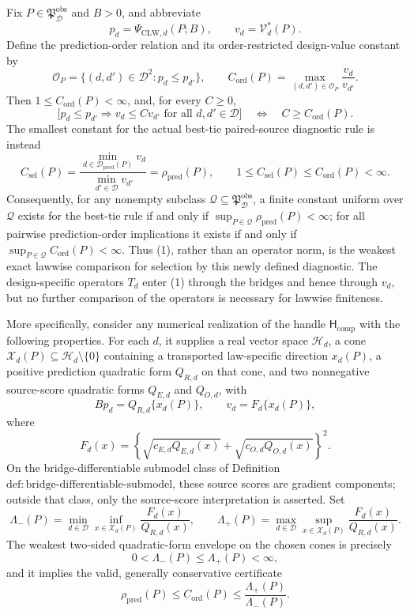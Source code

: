 Fix \(P\in\mathfrak P_{\mathcal D}^{\mathrm{obs}}\) and \(B>0\), and abbreviate
\[
 p_d=\Psi_{\mathrm{CLW},d}(P;B),
 \qquad v_d=\mathcal V_d^*(P).
\]
Define the prediction-order relation and its order-restricted design-value constant by
\[
 \mathcal O_P=\{(d,d')\in\mathcal D^2:p_d\le p_{d'}\},
 \qquad
 C_{\mathrm{ord}}(P)=\max_{(d,d')\in\mathcal O_P}\frac{v_d}{v_{d'}}. \tag{1}
\]
Then \(1\le C_{\mathrm{ord}}(P)<\infty\), and, for every \(C\ge0\),
\[
 \bigl[p_d\le p_{d'}\Longrightarrow v_d\le C v_{d'}
 \text{ for all }d,d'\in\mathcal D\bigr]
 \quad\Longleftrightarrow\quad C\ge C_{\mathrm{ord}}(P). \tag{2}
\]
The smallest constant for the actual best-tie paired-source diagnostic rule is instead
\[
 C_{\mathrm{sel}}(P)
 =\frac{\min_{d\in\mathcal D_{\mathrm{pred}}(P)}v_d}
 {\min_{d'\in\mathcal D}v_{d'}}
 =\rho_{\mathrm{pred}}(P),
 \qquad
 1\le C_{\mathrm{sel}}(P)\le C_{\mathrm{ord}}(P)<\infty. \tag{3}
\]
Consequently, for any nonempty subclass \(\mathcal Q\subseteq\mathfrak P_{\mathcal D}^{\mathrm{obs}}\), a finite constant uniform over \(\mathcal Q\) exists for the best-tie rule if and only if \(\sup_{P\in\mathcal Q}\rho_{\mathrm{pred}}(P)<\infty\); for all pairwise prediction-order implications it exists if and only if \(\sup_{P\in\mathcal Q}C_{\mathrm{ord}}(P)<\infty\). Thus (1), rather than an operator norm, is the weakest exact lawwise comparison for selection by this newly defined diagnostic. The design-specific operators \(T_d\) enter (1) through the bridges and hence through \(v_d\), but no further comparison of the operators is necessary for lawwise finiteness.

More specifically, consider any numerical realization of the handle \(\mathsf H_{\mathrm{comp}}\) with the following properties. For each \(d\), it supplies a real vector space \(\mathcal H_d\), a cone \(\mathcal X_d(P)\subseteq\mathcal H_d\setminus\{0\}\) containing a transported law-specific direction \(x_d(P)\), a positive prediction quadratic form \(Q_{R,d}\) on that cone, and two nonnegative source-score quadratic forms \(Q_{E,d}\) and \(Q_{O,d}\), with
\[
 Bp_d=Q_{R,d}\{x_d(P)\},
 \qquad v_d=F_d\{x_d(P)\}, \tag{4}
\]
where
\[
 F_d(x)=\left\{\sqrt{c_{E,d}Q_{E,d}(x)}+\sqrt{c_{O,d}Q_{O,d}(x)}\right\}^2. \tag{5}
\]
On the bridge-differentiable submodel class of Definition~\(\mathrm{def{:}bridge\text{-}differentiable\text{-}submodel}\), these source scores are gradient components; outside that class, only the source-score interpretation is asserted. Set
\[
 \Lambda_-(P)=\min_{d\in\mathcal D}\inf_{x\in\mathcal X_d(P)}\frac{F_d(x)}{Q_{R,d}(x)},
 \qquad
 \Lambda_+(P)=\max_{d\in\mathcal D}\sup_{x\in\mathcal X_d(P)}\frac{F_d(x)}{Q_{R,d}(x)}. \tag{6}
\]
The weakest two-sided quadratic-form envelope on the chosen cones is precisely
\[
 0<\Lambda_-(P)\le\Lambda_+(P)<\infty, \tag{7}
\]
and it implies the valid, generally conservative certificate
\[
 \rho_{\mathrm{pred}}(P)\le C_{\mathrm{ord}}(P)\le\frac{\Lambda_+(P)}{\Lambda_-(P)}. \tag{8}
\]

